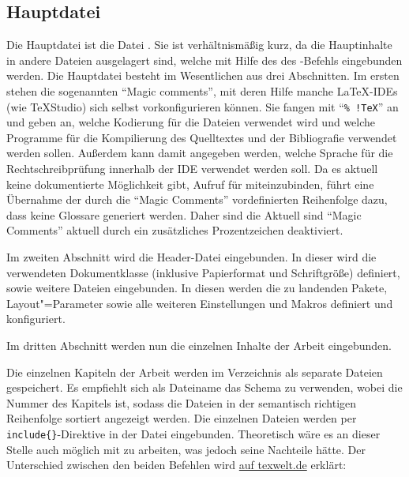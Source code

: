 \subsection[Hauptdatei \printfilepath{Diss.tex}]{Hauptdatei }%
%
\label{sec:Hauptdatei}
%
Die Hauptdatei ist die Datei .
Sie ist verhältnismäßig kurz, da die Hauptinhalte in andere Dateien ausgelagert sind, welche mit Hilfe des  \bzw des -Befehls eingebunden werden.
Die Hauptdatei besteht im Wesentlichen aus drei Abschnitten.
Im ersten stehen die sogenannten \enquote{Magic comments}, mit deren Hilfe manche \LaTeX-IDEs (wie \zB TeXStudio) sich selbst vorkonfigurieren können.
Sie fangen mit \enquote{\texttt{\%~!TeX}} an und geben an, welche Kodierung für die Dateien verwendet wird und welche Programme für die Kompilierung des Quelltextes und der Bibliografie verwendet werden sollen.
Außerdem kann damit angegeben werden, welche Sprache für die Rechtschreibprüfung innerhalb der IDE verwendet werden soll.
Da es aktuell keine dokumentierte Möglichkeit gibt, Aufruf für  miteinzubinden,
führt eine Übernahme der durch die \enquote{Magic Comments} vordefinierten Reihenfolge dazu, dass keine Glossare generiert werden.
Daher sind die Aktuell sind \enquote{Magic Comments} aktuell durch ein zusätzliches Prozentzeichen deaktiviert.

Im zweiten Abschnitt wird die Header-Datei eingebunden.
In dieser wird die verwendeten Dokumentklasse (inklusive Papierformat und Schriftgröße) definiert, sowie weitere Dateien eingebunden.
In diesen werden die zu landenden Pakete, Layout"=Parameter sowie alle weiteren Einstellungen und Makros definiert und konfiguriert.

Im dritten Abschnitt werden nun die einzelnen Inhalte der Arbeit eingebunden.

Die einzelnen Kapiteln der Arbeit werden im Verzeichnis  als separate Dateien gespeichert.
Es empfiehlt sich als Dateiname das Schema  zu verwenden, wobei  die Nummer des Kapitels ist,
sodass die Dateien in der semantisch richtigen Reihenfolge sortiert angezeigt werden.
Die einzelnen Dateien werden per \verb+include{}+-Direktive in der Datei  eingebunden.
Theoretisch wäre es an dieser Stelle auch möglich mit \verb++ zu arbeiten, was jedoch seine Nachteile hätte.
Der Unterschied zwischen den beiden Befehlen wird \href{https://texwelt.de/wissen/fragen/32/was-ist-der-unterschied-zwischen-include-and-input}{auf texwelt.de} erklärt:


